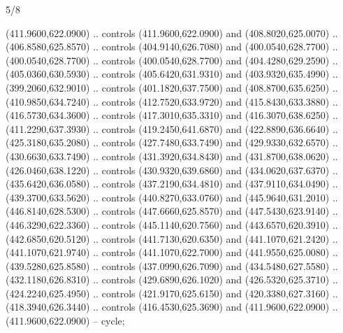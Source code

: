 \begin{flagdescription}{5/8}
\begin{scope}[shift={(m)}]
\begin{scope}[scale=\flagwidth/220,y=0.1mm, x=0.1mm, yscale=-1,shift={(-596,-360)}]
\begin{scope}[draw=black,line join=round,line cap=round,line width=0.381\lw]
\begin{scope}[line width=0.534\lw,fill=green]
 (411.9600,622.0900) .. controls (411.9600,622.0900) and
  (408.8020,625.0070) .. (406.8580,625.8570) .. controls (404.9140,626.7080) and
  (400.0540,628.7700) .. (400.0540,628.7700) .. controls (400.0540,628.7700) and
  (404.4280,629.2590) .. (405.0360,630.5930) .. controls (405.6420,631.9310) and
  (403.9320,635.4990) .. (399.2060,632.9010) .. controls (401.1820,637.7500) and
  (408.8700,635.6250) .. (410.9850,634.7240) .. controls (412.7520,633.9720) and
  (415.8430,633.3880) .. (416.5730,634.3600) .. controls (417.3010,635.3310) and
  (416.3070,638.6250) .. (411.2290,637.3930) .. controls (419.2450,641.6870) and
  (422.8890,636.6640) .. (425.3180,635.2080) .. controls (427.7480,633.7490) and
  (429.9330,632.6570) .. (430.6630,633.7490) .. controls (431.3920,634.8430) and
  (431.8700,638.0620) .. (426.0460,638.1220) .. controls (430.9320,639.6860) and
  (434.0620,637.6370) .. (435.6420,636.0580) .. controls (437.2190,634.4810) and
  (437.9110,634.0490) .. (439.3700,633.5620) .. controls (440.8270,633.0760) and
  (445.9640,631.2010) .. (446.8140,628.5300) .. controls (447.6660,625.8570) and
  (447.5430,623.9140) .. (446.3290,622.3360) .. controls (445.1140,620.7560) and
  (443.6570,620.3910) .. (442.6850,620.5120) .. controls (441.7130,620.6350) and
  (441.1070,621.2420) .. (441.1070,621.9740) .. controls (441.1070,622.7000) and
  (441.9550,625.0080) .. (439.5280,625.8580) .. controls (437.0990,626.7090) and
  (434.5480,627.5580) .. (432.1180,626.8310) .. controls (429.6890,626.1020) and
  (426.5320,625.3710) .. (424.2240,625.4950) .. controls (421.9170,625.6150) and
  (420.3380,627.3160) .. (418.3940,626.3440) .. controls (416.4530,625.3690) and
  (411.9600,622.0900) .. (411.9600,622.0900) -- cycle;


\end{scope}
\end{scope}
\end{scope}
\end{scope}
\end{flagdescription}
